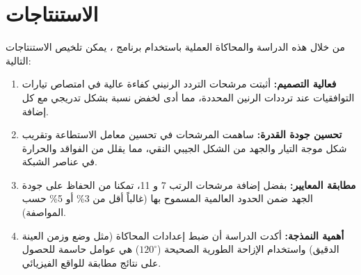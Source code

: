 \section{الاستنتاجات} \label{part1:sec5}

من خلال هذه الدراسة والمحاكاة العملية باستخدام برنامج ، يمكن تلخيص الاستنتاجات التالية:

\begin{enumerate}
    \item \textbf{فعالية التصميم:} أثبتت مرشحات التردد الرنيني  كفاءة عالية في امتصاص تيارات التوافقيات عند ترددات الرنين المحددة، مما أدى لخفض نسبة  بشكل تدريجي مع كل إضافة.
    \item \textbf{تحسين جودة القدرة:} ساهمت المرشحات في تحسين معامل الاستطاعة وتقريب شكل موجة التيار والجهد من الشكل الجيبي النقي، مما يقلل من الفواقد والحرارة في عناصر الشبكة.
    \item \textbf{مطابقة المعايير:} بفضل إضافة مرشحات الرتب 7 و 11، تمكنا من الحفاظ على جودة الجهد ضمن الحدود العالمية المسموح بها (غالباً أقل من 3\% أو 5\% حسب المواصفة).
    \item \textbf{أهمية النمذجة:} أكدت الدراسة أن ضبط إعدادات المحاكاة (مثل وضع  وزمن العينة الدقيق) واستخدام الإزاحة الطورية الصحيحة ($120^\circ$) هي عوامل حاسمة للحصول على نتائج مطابقة للواقع الفيزيائي.
\end{enumerate}

